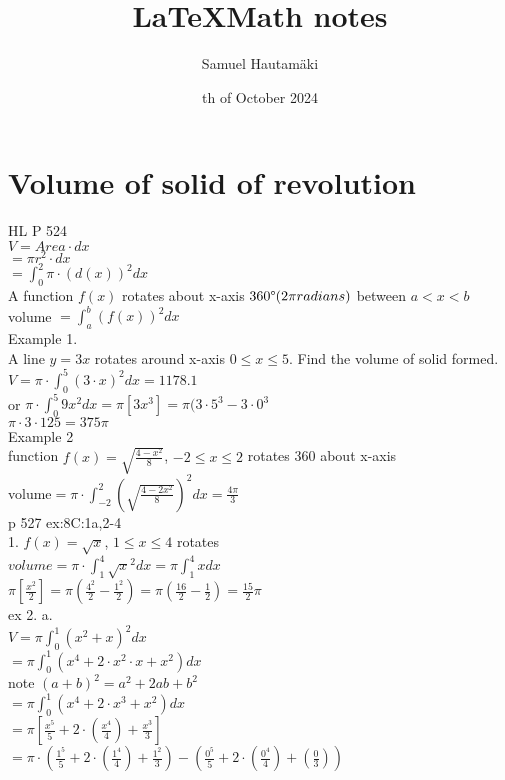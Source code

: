 \documentclass{article}
\title{\LaTeX Math notes}
\author{Samuel Hautamäki}
\date{th of October 2024}
\begin{document}
  \maketitle
   
  \section{Volume of solid of revolution}
  HL P 524\\
  $V= Area\cdot dx$\\
  $=\pi r^2\cdot dx$\\
  $=\int_{0}^{2}\pi\cdot(d(x))^2dx$\\
  A function $f(x)$ rotates about x-axis $360\degree (2\pi radians)$ between $a<x<b$\\
  volume $=\int_{a}^{b}(f(x))^2dx$\\
  Example 1. \\
  A line $y=3x$ rotates around x-axis $0\leq x\leq 5$. Find the volume of solid formed.\\
  $V=\pi\cdot\int_{0}^{5}(3\cdot x)^2dx=1178.1$\\
  or $\pi\cdot\int_{0}^{5}9x^2dx=\pi[3x^3]=\pi(3\cdot5^3-3\cdot0^3$\\
  $\pi\cdot 3\cdot 125=375\pi$\\
  Example 2\\
  function $f(x)=\sqrt{\frac{4-x^2}{8}}$, $-2\leq x\leq2$ rotates 360 about x-axis\\
  volume$=\pi\cdot\int_{-2}^{2}(\sqrt{\frac{4-2x^2}{8}})^2dx=\frac{4\pi}{3}$\\
  p 527 ex:8C:1a,2-4\\
  1. $f(x)=\sqrt{x}$, $1\leq x\leq 4$ rotates\\
  $volume=\pi\cdot\int_{1}^{4}\sqrt{x}^2dx=\pi \int_{1}^{4}xdx$\\
  $\pi[\frac{x^2}{2}]=\pi(\frac{4^2}{2}-\frac{1^2}{2})=\pi(\frac{16}{2}-\frac{1}{2})=\frac{15}{2}\pi$\\
  ex 2. a. \\
  $V=\pi\int_{0}^{1}(x^2+x)^2dx$\\
  $=\pi\int_{0}^{1}(x^4+2\cdot x^2\cdot x+x^2)dx$\\
  note $(a+b)^2=a^2+2ab+b^2$\\
  $=\pi\int_{0}^{1}(x^4+2\cdot x^3+x^2)dx$\\
  $=\pi[ \frac{x^5}{5} +2\cdot (\frac{x^4}{4})+\frac{x^3}{3}]$\\
  $=\pi\cdot(\frac{1^5}{5}+2\cdot (\frac{1^4}{4})+\frac{1^2}{3})-(\frac{0^5}{5}+2\cdot (\frac{0^4}{4})+(\frac{0}{3}))$\\
\end{document}
